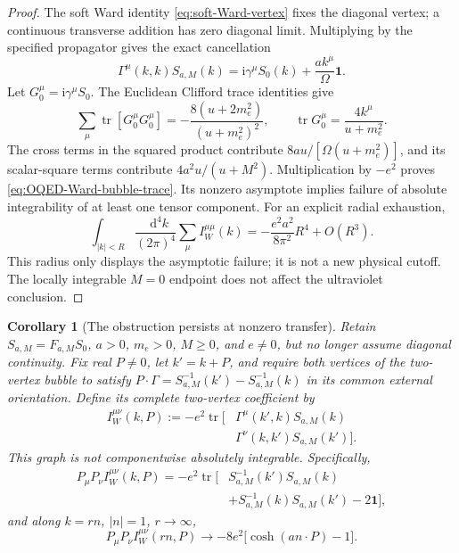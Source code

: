 \documentclass[final,5p,times,twocolumn,numbers,nopreprintline]{elsarticle}
\numberwithin{equation}{section}
\newtheorem{corollary}[theorem]{Corollary}
\theoremstyle{definition}
\theoremstyle{remark}
\newcommand{\dd}{\mathop{}\!\mathrm d}
\newcommand{\ii}{\mathrm i}
\newcommand{\Tr}{\operatorname{tr}}
\newcommand{\one}{\mathbf 1}
\begin{document}
\begin{proof}
The soft Ward identity \eqref{eq:soft-Ward-vertex} fixes the diagonal
vertex; a continuous transverse addition has zero diagonal limit.
Multiplying by the specified propagator gives the exact cancellation
\begin{equation}
 \Gamma^\mu(k,k)S_{a,M}(k)
       =\ii\gamma^\mu S_0(k)+\frac{a k^\mu}{\Omega}\one.
\label{eq:OQED-Ward-line-cancellation}
\end{equation}
Let \(G_0^\mu=\ii\gamma^\mu S_0\). The Euclidean Clifford trace
identities give
\[
 \sum_\mu\Tr[G_0^\mu G_0^\mu]
     =-\frac{8(u+2m_e^2)}{(u+m_e^2)^2},\qquad
 \Tr G_0^\mu=\frac{4k^\mu}{u+m_e^2}.
\]
The cross terms in the squared product contribute
\(8a u/[\Omega(u+m_e^2)]\), and its scalar-square terms contribute
\(4a^2u/(u+M^2)\). Multiplication by \(-e^2\) proves
\eqref{eq:OQED-Ward-bubble-trace}. Its nonzero asymptote implies
failure of absolute integrability of at least one tensor component.
For an explicit radial exhaustion,
\begin{equation}
 \int_{|k|<R}\frac{\dd^4k}{(2\pi)^4}
       \sum_\mu I_W^{\mu\mu}(k)
       =-\frac{e^2a^2}{8\pi^2}R^4+O(R^3).
\label{eq:OQED-Ward-bubble-exhaustion}
\end{equation}
This radius only displays the asymptotic failure; it is not a new
physical cutoff. The locally integrable \(M=0\) endpoint does not
affect the ultraviolet conclusion.
\end{proof}

\begin{corollary}[The obstruction persists at nonzero transfer]
\label{cor:OQED-fixed-transfer-obstruction}
Retain \(S_{a,M}=F_{a,M}S_0\), \(a>0\), \(m_e>0\),
\(M\geq0\), and \(e\ne0\), but no longer assume diagonal
continuity. Fix real \(P\ne0\), let \(k'=k+P\), and require both
vertices of the two-vertex bubble to satisfy
\(P\cdot\Gamma=S_{a,M}^{-1}(k')-S_{a,M}^{-1}(k)\) in its common
external orientation. Define its complete two-vertex coefficient by
\[
 \begin{aligned}
 I_W^{\mu\nu}(k,P):=-e^2\Tr\bigl[&\Gamma^\mu(k',k)S_{a,M}(k)\\
                    &\Gamma^\nu(k,k')S_{a,M}(k')\bigr].
 \end{aligned}
\]
This graph is not componentwise absolutely integrable. Specifically,
\begin{equation}
\begin{aligned}
 P_\mu P_\nu I_W^{\mu\nu}(k,P)
 =-e^2\Tr\bigl[&S_{a,M}^{-1}(k')S_{a,M}(k)\\
               &+S_{a,M}^{-1}(k)S_{a,M}(k')-2\one\bigr],
\end{aligned}
\label{eq:OQED-double-Ward-contraction}
\end{equation}
and along \(k=rn\), \(|n|=1\), \(r\to\infty\),
\begin{equation}
 P_\mu P_\nu I_W^{\mu\nu}(rn,P)
       \longrightarrow-8e^2\bigl[\cosh(a n\cdot P)-1\bigr].
\label{eq:OQED-fixed-transfer-obstruction}
\end{equation}
\end{corollary}
\end{document}
